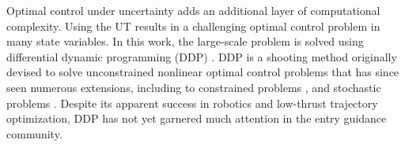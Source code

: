 \documentclass[journal ]{new-aiaa}
\begin{document}
Optimal control under uncertainty adds an additional layer of computational complexity. Using the UT results in a challenging optimal control problem in many state variables. In this work, the large-scale problem is solved using differential dynamic programming (DDP) \cite{DDP}. DDP is a shooting method originally devised to solve unconstrained nonlinear optimal control problems that has since seen numerous extensions, including to constrained problems \cite{DDP_ControlLimited,HDDP1,HDDP2,DDP_NonlinearConstraints,DDP_InteriorPoint}, and stochastic problems \cite{iLQG, DDP_Stochastic, ozaki_UT,ozaki2020tube}. 
Despite its apparent success in robotics and low-thrust trajectory optimization, DDP has not yet garnered much attention in the entry guidance community. 




 
\end{document}

